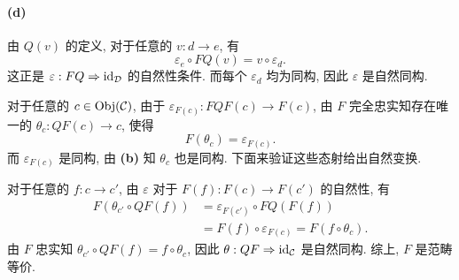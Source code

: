 \documentclass{article}
\begin{document}
\begin{solution}
	\paragraph{(d)} 由 $Q(v)$ 的定义, 对于任意的 $v: d \to e$, 有
	\[ \varepsilon_e \circ FQ(v) = v \circ \varepsilon_d. \]
	这正是 $\varepsilon: FQ \Rightarrow \operatorname{id}_{\mathcal D}$ 的自然性条件. 而每个 $\varepsilon_d$ 均为同构, 因此 $\varepsilon$ 是自然同构.

	对于任意的 $c \in \operatorname{Obj}(\mathcal C)$, 由于 $\varepsilon_{F(c)}: FQF(c) \to F(c)$, 由 $F$ 完全忠实知存在唯一的 $\theta_c: QF(c) \to c$, 使得
	\[ F(\theta_c) = \varepsilon_{F(c)}. \]
	而 $\varepsilon_{F(c)}$ 是同构, 由 \textbf{(b)} 知 $\theta_c$ 也是同构. 下面来验证这些态射给出自然变换.

	对于任意的 $f: c \to c'$, 由 $\varepsilon$ 对于 $F(f): F(c) \to F(c')$ 的自然性, 有
	\[ \begin{aligned}
		F(\theta_{c'} \circ QF(f)) &= \varepsilon_{F(c')} \circ FQ(F(f)) \\
		&= F(f) \circ \varepsilon_{F(c)} = F(f \circ \theta_c).
	\end{aligned} \]
	由 $F$ 忠实知 $\theta_{c'} \circ QF(f) = f \circ \theta_c$, 因此 $\theta: QF \Rightarrow \operatorname{id}_{\mathcal C}$ 是自然同构. 综上, $F$ 是范畴等价.
\end{solution}
\end{document}
